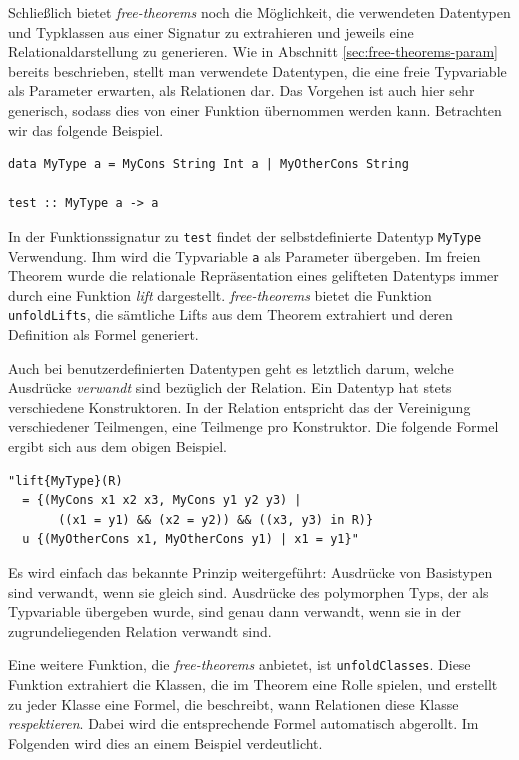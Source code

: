 
Schließlich bietet \textit{free-theorems} noch die Möglichkeit, die verwendeten Datentypen und Typklassen aus einer
Signatur zu extrahieren und jeweils eine Relationaldarstellung zu generieren. Wie in Abschnitt \ref{sec:free-theorems-param}
bereits beschrieben, stellt man verwendete Datentypen, die eine freie Typvariable als Parameter erwarten, als Relationen
dar. Das Vorgehen ist auch hier sehr generisch, sodass dies von einer Funktion übernommen werden kann. Betrachten wir
das folgende Beispiel.

\begin{verbatim}
data MyType a = MyCons String Int a | MyOtherCons String

test :: MyType a -> a
\end{verbatim}

In der Funktionssignatur zu \texttt{test} findet der selbstdefinierte Datentyp \texttt{MyType} Verwendung. Ihm wird die
Typvariable \texttt{a} als Parameter übergeben. Im freien Theorem wurde die relationale Repräsentation eines gelifteten
Datentyps immer durch eine Funktion \textit{lift} dargestellt. \textit{free-theorems} bietet die Funktion \texttt{unfoldLifts},
die sämtliche Lifts aus dem Theorem extrahiert und deren Definition als Formel generiert.

Auch bei benutzerdefinierten Datentypen geht es letztlich darum, welche Ausdrücke \textit{verwandt} sind bezüglich der
Relation. Ein Datentyp hat stets verschiedene Konstruktoren. In der Relation entspricht das der Vereinigung verschiedener
Teilmengen, eine Teilmenge pro Konstruktor. Die folgende Formel ergibt sich aus dem obigen Beispiel.

\begin{verbatim}
"lift{MyType}(R)
  = {(MyCons x1 x2 x3, MyCons y1 y2 y3) |
       ((x1 = y1) && (x2 = y2)) && ((x3, y3) in R)}
  u {(MyOtherCons x1, MyOtherCons y1) | x1 = y1}"
\end{verbatim}

Es wird einfach das bekannte Prinzip weitergeführt: Ausdrücke von Basistypen sind verwandt, wenn sie gleich sind. Ausdrücke
des polymorphen Typs, der als Typvariable übergeben wurde, sind genau dann verwandt, wenn sie in der zugrundeliegenden
Relation verwandt sind.

Eine weitere Funktion, die \textit{free-theorems} anbietet, ist \texttt{unfoldClasses}. Diese Funktion extrahiert die Klassen,
die im Theorem eine Rolle spielen, und erstellt zu jeder Klasse eine Formel, die beschreibt, wann Relationen diese Klasse
\textit{respektieren}. Dabei wird die entsprechende Formel automatisch abgerollt. Im Folgenden wird dies an einem Beispiel
verdeutlicht.

